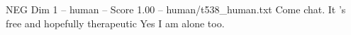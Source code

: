 \begin{textsample}{NEG Dim 1 – human – Score 1.00 – human/t538\_human.txt}  \label{ex:f1_neg_001}
Come chat.
It 's free and hopefully therapeutic Yes I am alone too.

\end{textsample}
